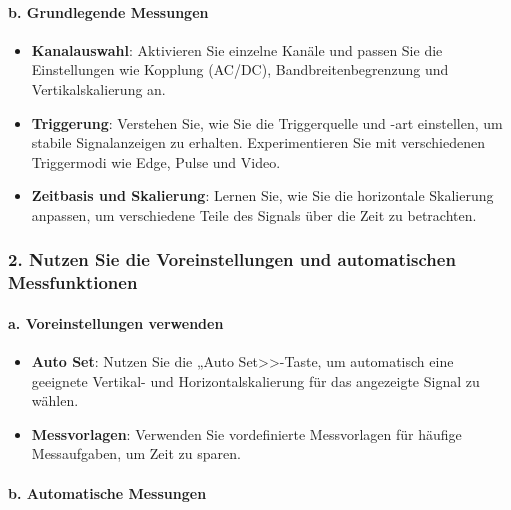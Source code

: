 \documentclass{vorlage-design-main}
\begin{document}
\hypertarget{b.-grundlegende-messungen}{%
\paragraph{b. Grundlegende Messungen}\label{b.-grundlegende-messungen}}

\begin{itemize}

\item
  \textbf{Kanalauswahl}: Aktivieren Sie einzelne Kanäle und passen Sie
  die Einstellungen wie Kopplung (AC/DC), Bandbreitenbegrenzung und
  Vertikalskalierung an.
\item
  \textbf{Triggerung}: Verstehen Sie, wie Sie die Triggerquelle und -art
  einstellen, um stabile Signalanzeigen zu erhalten. Experimentieren Sie
  mit verschiedenen Triggermodi wie Edge, Pulse und Video.
\item
  \textbf{Zeitbasis und Skalierung}: Lernen Sie, wie Sie die horizontale
  Skalierung anpassen, um verschiedene Teile des Signals über die Zeit
  zu betrachten.
\end{itemize}

\hypertarget{nutzen-sie-die-voreinstellungen-und-automatischen-messfunktionen}{%
\subsubsection{2. Nutzen Sie die Voreinstellungen und automatischen
Messfunktionen}\label{nutzen-sie-die-voreinstellungen-und-automatischen-messfunktionen}}

\hypertarget{a.-voreinstellungen-verwenden}{%
\paragraph{a. Voreinstellungen
verwenden}\label{a.-voreinstellungen-verwenden}}

\begin{itemize}

\item
  \textbf{Auto Set}: Nutzen Sie die „Auto Set>>-Taste, um automatisch
  eine geeignete Vertikal- und Horizontalskalierung für das angezeigte
  Signal zu wählen.
\item
  \textbf{Messvorlagen}: Verwenden Sie vordefinierte Messvorlagen für
  häufige Messaufgaben, um Zeit zu sparen.
\end{itemize}

\hypertarget{b.-automatische-messungen}{%
\paragraph{b. Automatische Messungen}\label{b.-automatische-messungen}}
\end{document}
